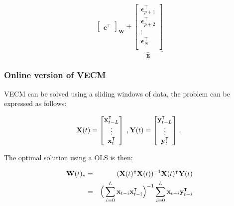 \documentclass{beamer}
\begin{document}
\begin{frame}
{\begin{equation*}
{\begin{bmatrix}
   \mathbf{c}^\intercal
   \end{bmatrix}
}_{\mathbf{W}}
+
\underbrace{
\begin{bmatrix}
   \boldsymbol{\epsilon}_{p+1}^\intercal \\
   \boldsymbol{\epsilon}_{p+2}^\intercal \\
   \vdots \\
   \boldsymbol{\epsilon}_N^\intercal \\
   \end{bmatrix}
}_{\mathbf{E}}
\end{equation*}}
\end{frame}

\begin{frame}
\frametitle{Online version of VECM}
VECM can be solved using a sliding windows of data, the problem can be expressed as follows:
 
{\color{blue}
\[
\mathbf{X}(t) = 
\begin{bmatrix} 
\mathbf{x}_{t-L}^\intercal \\ \vdots \\ \mathbf{x}_t^\intercal
\end{bmatrix} \; , 
{\bf Y}(t) = \begin{bmatrix} \mathbf{y}^\intercal_{t-L} \\ \vdots \\ \mathbf{y}^\intercal_t \end{bmatrix} \; .
\]
}

The optimal solution using a OLS is then:

{\color{blue}
\begin{eqnarray}
{\bf W}(t)_*&=&({\bf X}(t)^\intercal{\bf X}(t))^{-1}{\bf X}(t)^\intercal{\bf Y}(t) \\
&=&\Big( \displaystyle \sum_{i=0}^L \mathbf{x}_{t-i}
\mathbf{x}_{t-i}^\intercal \Big)^{-1} \displaystyle \sum_{i=0}^L \mathbf{x}_{t-i} \mathbf{y}^\intercal_{t-i}
\end{eqnarray}
}
\end{frame}
\end{document}
